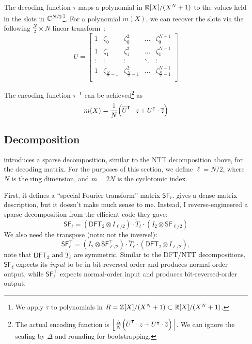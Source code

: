 \documentclass[../fheimpl.tex]{subfiles}
\begin{document}
    The decoding function $\tau$ maps a polynomial in $\mathbb{R}[X]/(X^N+1)$ to the values held in the slots in $\mathbb{C}^{N/2}$\footnote{We apply $\tau$ to polynomials in $R=\mathbb{Z}[X]/(X^N+1)\subset \mathbb{R}[X]/(X^N+1)$.}. For a polynomial $m(X)$, we can recover the slots via the following $\frac{N}{2}\times N$ linear transform~\cite{cryptoeprint:2018/153}:
    \[U=
	\begin{bmatrix}
		1 & \zeta_0 & \zeta_0^2 & \ldots & \zeta_0^{N-1} \\
		1 & \zeta_1 & \zeta_1^2 & \ldots & \zeta_1^{N-1} \\
		\vdots & \vdots & \vdots & \ddots & \vdots \\
		1 & \zeta_{\frac{N}{2}-1} & \zeta_{\frac{N}{2}-1}^2 & \ldots & \zeta_{\frac{N}{2}-1}^{N-1} \\
		
	\end{bmatrix}
    \]
	
    The encoding function $\tau^{-1}$ can be achieved\footnote{The actual encoding function is $\round*{\frac{\Delta}{N}\parens*{\overline{U}^\intercal\cdot z+U^\intercal \cdot \overline{z}}}$. We can ignore the scaling by $\Delta$ and rounding for bootstrapping.} as
    \[m(X) = \frac{1}{N}\parens*{\overline{U}^\intercal\cdot z+U^\intercal \cdot \overline{z}}\]

    \subsection{Decomposition}
    \cite{cryptoeprint:2018/1043} introduces a sparse decomposition, similar to the NTT decomposition above, for the decoding matrix. For the purposes of this section, we define $\ell=N/2$, where $N$ is the ring dimension, and $m=2N$ is the cyclotomic index.

    First, it defines a ``special Fourier transform'' matrix $\mathsf{SF}_\ell$. \cite{cryptoeprint:2018/1043} gives a dense matrix description, but it doesn't make much sense to me. Instead, I reverse-engineered a sparse decomposition from the efficient code they gave:
    \[\mathsf{SF}_\ell = (\mathsf{DFT}_2\otimes I_{\ell/2})\cdot \tilde{T}_\ell\cdot(I_2\otimes \mathsf{SF}_{\ell/2})\]
    We also need the transpose (note: not the inverse!):
    \[\mathsf{SF}^\intercal_\ell = (I_2\otimes \mathsf{SF}_{\ell/2}^\intercal)\cdot \tilde{T}_\ell\cdot(\mathsf{DFT}_2\otimes I_{\ell/2}),\]
    note that $\mathsf{DFT}_2$ and $\tilde{T}_\ell$ are symmetric.
    Similar to the DFT/NTT decompositions, $\mathsf{SF}_\ell$ expects its \emph{input} to be in bit-reversed order and produces normal-order output, while $\mathsf{SF}^\intercal_\ell$ expects normal-order input and produces bit-reversed-order output.
\end{document}
